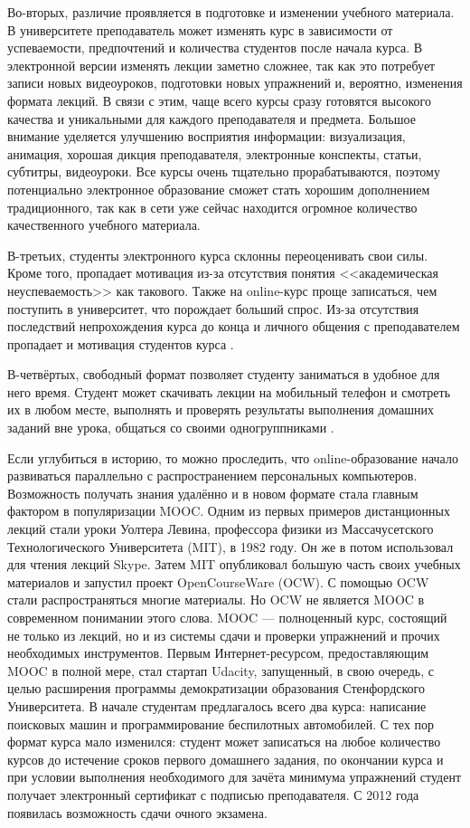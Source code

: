 \documentclass{matmex-diploma-custom}
\begin{document}
Во-вторых, различие проявляется в подготовке и изменении учебного
материала. В университете преподаватель может изменять курс в
зависимости от успеваемости, предпочтений и количества студентов после
начала курса. В электронной версии изменять лекции заметно сложнее,
так как это потребует записи новых видеоуроков, подготовки новых
упражнений и, вероятно, изменения формата лекций. В связи с этим, чаще
всего курсы сразу готовятся высокого качества и уникальными для
каждого преподавателя и предмета. Большое внимание уделяется улучшению
восприятия информации: визуализация, анимация, хорошая дикция
преподавателя, электронные конспекты, статьи, субтитры,
видеоуроки. Все курсы очень тщательно прорабатываются, поэтому
потенциально электронное образование сможет стать хорошим дополнением
традиционного, так как в сети уже сейчас находится огромное количество
качественного учебного материала.

В-третьих, студенты электронного курса склонны переоценивать свои
силы. Кроме того, пропадает мотивация из-за отсутствия понятия <<академическая
неуспеваемость>> как такового. Также на online-курс
проще записаться, чем поступить в университет, что порождает больший
спрос. Из-за отсутствия последствий непрохождения курса до конца и личного
общения с преподавателем пропадает и мотивация студентов курса \cite{Clow}.

В-четвёртых, свободный формат позволяет студенту заниматься в
удобное для него время. Студент может скачивать лекции на мобильный
телефон и смотреть их в любом месте, выполнять и проверять результаты
выполнения домашних заданий вне урока, общаться со своими
одногруппниками \cite{mak2010blogs}.

Если углубиться в историю, то можно проследить, что online-образование
начало развиваться параллельно с распространением персональных
компьютеров. Возможность получать знания удалённо и в новом формате
стала главным фактором в популяризации MOOC. Одним из первых примеров
дистанционных лекций стали уроки Уолтера Левина, профессора физики из
Массачусетского Технологического Университета (MIT), в 1982 году. Он
же в потом использовал для чтения лекций Skype. Затем MIT опубликовал
большую часть своих учебных материалов и запустил проект
OpenCourseWare (OCW). С помощью OCW стали распространяться многие
материалы. Но OCW не является MOOC в современном понимании этого
слова. MOOC --- полноценный курс, состоящий не только из лекций, но и
из системы сдачи и проверки упражнений и прочих необходимых
инструментов. Первым Интернет-ресурсом, предоставляющим MOOC в полной
мере, стал стартап Udacity, запущенный, в свою очередь, с целью
расширения программы демократизации образования Стенфордского
Университета. В начале студентам предлагалось всего два курса:
написание поисковых машин и программирование беспилотных
автомобилей. С тех пор формат курса мало изменился: студент может
записаться на любое количество курсов до истечение сроков первого
домашнего задания, по окончании курса и при условии выполнения
необходимого для зачёта минимума упражнений студент получает
электронный сертификат с подписью преподавателя. С 2012 года появилась
возможность сдачи очного экзамена.
\end{document}
